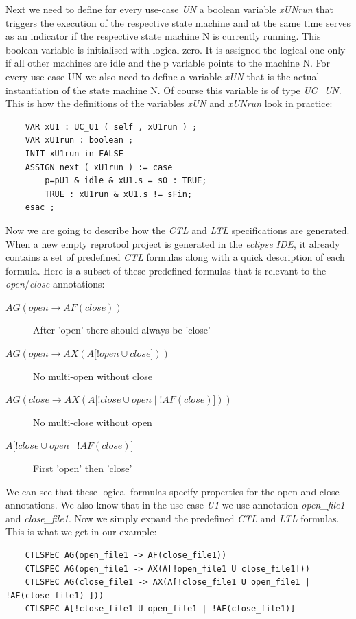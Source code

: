 Next we need to define for every use-case \emph{UN} a boolean variable \emph{xUNrun} that triggers the execution of the respective state machine
and at the same time serves as an indicator if the respective state machine N is currently running. This boolean variable is
initialised with logical zero. It is assigned the logical one only if all other machines are idle and the p variable points to the
machine N. For every use-case UN we also need to define a variable \emph{xUN} that is the actual instantiation of the state machine N.
Of course this variable is of type \emph{UC\_UN}. This is how the definitions of the variables \emph{xUN} and \emph{xUNrun} look in practice:
\begin{lstlisting}
 	VAR xU1 : UC_U1 ( self , xU1run ) ;
	VAR xU1run : boolean ;
	INIT xU1run in FALSE
	ASSIGN next ( xU1run ) := case
		p=pU1 & idle & xU1.s = s0 : TRUE;
		TRUE : xU1run & xU1.s != sFin;
	esac ;
\end{lstlisting}

Now we are going to describe how the \emph{CTL} and \emph{LTL} specifications are generated. When a new empty reprotool project is generated in the
\emph{eclipse IDE}, it already contains a set of predefined \emph{CTL} formulas along with a quick description of each formula. Here is a subset of
these predefined formulas that is relevant to the \emph{open}/\emph{close} annotations:

\begin{description}
 \item [$AG(open \rightarrow AF(close))$] After 'open' there should always be 'close'
 \item [$AG(open \rightarrow AX(A\lbrack!open \cup close\rbrack))$] No multi-open without close
 \item [$AG(close \rightarrow AX(A\lbrack!close \cup open \mid !AF(close) \rbrack))$] No multi-close without open
 \item [$A\lbrack !close \cup open \mid !AF(close)\rbrack$] First 'open' then 'close'
\end{description}

We can see that these logical formulas specify properties for the open and close annotations. We also know that in the use-case \emph{U1} we
use annotation \emph{open\_file1} and \emph{close\_file1}. Now we simply expand the predefined \emph{CTL} and \emph{LTL} formulas. This is what we get in our
example:
\begin{lstlisting}
 	CTLSPEC AG(open_file1 -> AF(close_file1))
	CTLSPEC AG(open_file1 -> AX(A[!open_file1 U close_file1]))
	CTLSPEC AG(close_file1 -> AX(A[!close_file1 U open_file1 | !AF(close_file1) ]))
	CTLSPEC A[!close_file1 U open_file1 | !AF(close_file1)]
\end{lstlisting}

